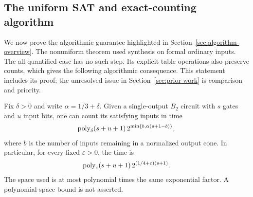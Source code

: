 \subsection{The uniform SAT and exact-counting algorithm}
\label{sec:counting-algorithm}

We now prove the algorithmic guarantee highlighted in
Section~\ref{sec:algorithm-overview}. The nonuniform theorem used
synthesis on formal ordinary inputs.
The all-quantified case has no such step. Its explicit table operations
also preserve counts, which gives the following algorithmic consequence.
This statement includes its proof; the unresolved issue in
Section~\ref{sec:prior-work} is comparison and priority.

\begin{corollary}
\label{cor:gate-counting}
Fix $\delta>0$ and write $\alpha=1/3+\delta$. Given a single-output
$B_2$ circuit with $s$ gates and $u$ input bits, one can count its
satisfying inputs in time
\[
 \operatorname{poly}_\delta(s+u+1)\,
 2^{\min\{b,\alpha(s+1-b)\}},
\]
where $b$ is the number of inputs remaining in a normalized output
cone. In particular, for every fixed $\varepsilon>0$, the time is
\[
 \operatorname{poly}_\varepsilon(s+u+1)\,
 2^{(1/4+\varepsilon)(s+1)}.
\]
The space used is at most polynomial times the same exponential
factor. A polynomial-space bound is not asserted.
\end{corollary}
